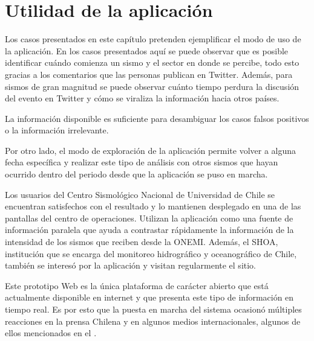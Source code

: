 	
\section{Utilidad de la aplicación}
\label{sec:conclusionCasos}

	Los casos presentados en este capítulo pretenden ejemplificar el modo de uso de la aplicación. En los casos presentados aquí se puede observar que es posible identificar cuándo comienza un sismo y el sector en donde se percibe, todo esto gracias a los comentarios que las personas publican en Twitter. Además, para sismos de gran magnitud se puede observar cuánto tiempo perdura la discusión del evento en Twitter y cómo se viraliza la información hacia otros países.

	La información disponible es suficiente para desambiguar los casos falsos positivos o la información irrelevante. 
	
	Por otro lado, el modo de exploración de la aplicación permite volver a alguna fecha específica y realizar este tipo de análisis con otros sismos que hayan ocurrido dentro del periodo desde que la aplicación se puso en marcha.
	
	Los usuarios del Centro Sismológico Nacional de Universidad de Chile se encuentran satisfechos con el resultado y lo mantienen desplegado en una de las pantallas del centro de operaciones. Utilizan la aplicación como una fuente de información paralela que ayuda a contrastar rápidamente la información de la intensidad de los sismos que reciben desde la ONEMI. Además, el SHOA, institución que se encarga del monitoreo hidrográfico y oceanográfico de Chile, también se interesó por la aplicación y visitan regularmente el sitio. 
	
	Este prototipo Web es la única plataforma de carácter abierto que está actualmente disponible en internet y que presenta este tipo de información en tiempo real. Es por esto que la puesta en marcha del sistema ocasionó múltiples reacciones en la prensa Chilena y en algunos medios internacionales, algunos de ellos mencionados en el .
	